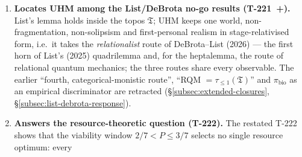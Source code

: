 \begin{enumerate}[leftmargin=2em]
        $\mathbf{Topoi}_\infty$ (T-211~; its former full embedding into
        $\mathbf{Topoi}_\infty$ is retracted \status{$\times$}), the $U$-projection
        as the $G_2$-twirl $X \mapsto \tfrac17\Tr(X)\mathbf{1}$ (T-212$'$~; its
        former identification with the rheonomy modality $\mathrm{Rh}$ is retracted
        \status{$\times$}, since Rh preserves global points), a Kolmogorov-free Yoneda
        representability via the Bures description length (T-213),
        a \emph{positive} hard-problem meta-theorem proving the
        ontological bridge $\Gam \to$ experience is structurally
        external (T-214), the cross-layer identity convention
        $\iota_{\min}/\iota_{\max}$ (T-215), a closed-form analytical
        $\varepsilon_{\mathrm{eff}}$ (T-216), L3 tricategorical
        coherence via $\tau_{\leq 3}(\mathbf{Exp}_\infty)$
        + Baez--Dolan (T-217), the SYNARC cognitive complex as a Kan
        complex (T-218; its 3-coskeletal truncation only on the viable subset,
        ), the $\Lambda$ SUSY-suppression $\varepsilon^{12}$ via
        three-sector product (T-219, now a hypothesis : its sectors were
        the axis triples of the retracted decomposition 48a, and its own one-loop
        sum $\sim 3\varepsilon^4 M_P^4$ exceeds $\varepsilon^{12}M_P^4$ unless lower
        orders cancel), and the no-reduction theorem
        ruling out $F_4$-UHM $\to G_2$-UHM functorial section
        via five independent obstructions (T-220, ``[T] negative'').
  \item \textbf{Locates UHM among the List/DeBrota no-go results
        (T-221~+).} List's lemma holds inside the topos
        $\mathfrak T$; UHM keeps one world, non-fragmentation, non-solipsism and
        first-personal realism in stage-relativised form, i.e.\ it takes the
        \emph{relationalist} route of DeBrota--List (2026) --- the first horn of
        List's (2025) quadrilemma and, for the heptalemma, the route of relational
        quantum mechanics; the three routes share every observable. The earlier
        ``fourth, categorical-monistic route'', ``RQM $= \tau_{\leq 1}(\mathfrak T)$''
        and $\pi_{\mathrm{bio}}$ as an empirical discriminator are retracted
        \status{$\times$} (\S\ref{subsec:extended-closures},
        \S\ref{subsec:list-debrota-response}).
  \item \textbf{Answers the resource-theoretic question (T-222).}
        The restated T-222 shows that the viability window
        $2/7 < P \leq 3/7$ selects no single resource optimum: every

\end{enumerate}
